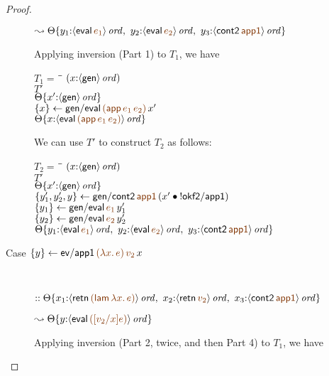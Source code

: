 \begin{proof}
\begin{description}
\qquad\qquad
  $\leadsto
   \tackon{\Theta}
     {y_1{:}\istrue{\susp{{\sf eval}\,\lf{e_1}}}, ~
      y_2{:}\istrue{\susp{{\sf eval}\,\lf{e_2}}}, ~
      y_3{:}\istrue{\susp{{\sf cont2}\,\lf{\sf app1}}}}$
\medskip

Applying inversion (Part 1) to $T_1$, we have 

\begin{tabbing}
$T_1 = ~$ \= \qquad \= $(x{:}{\langle {\sf gen} \rangle}\,{{\it ord}})$
\\
\>$T'$
\\
\>\>${\Theta}\{{x'{:}{\langle {\sf gen} \rangle}\,{{\it ord}}}\}$
\\
\>$\trstep{x}{{\sf gen/eval}\,\lf{({\sf app}\,e_1\,e_2)}\,x'}$
\\
\>\>$\tackon{\Theta}{x{:}\istrue{\susp{{\sf eval}\,\lf{({\sf app}\,e_1\,e_2)}}}}$
\end{tabbing}

We can use $T'$ to construct $T_2$ as follows:

\begin{tabbing}
$T_2 = ~$ \= \qquad \= $(x{:}{\langle {\sf gen} \rangle}\,{{\it ord}})$
\\
\>$T'$
\\
\>\>${\Theta}\{{x'{:}{\langle {\sf gen} \rangle}\,{{\it ord}}}\}$
\\
\>$\trstep{y_1',y_2',y}{{\sf gen/cont2}\,\lf{{\sf app1}}\,(\tfuser{x'}{\tbangr{{\sf okf2/app1}}})}$
\\
\>$\trstep{y_1}{{\sf gen/eval}\,\lf{e_1}\,y_1'}$
\\
\>$\trstep{y_2}{{\sf gen/eval}\,\lf{e_2}\,y_2'}$
\\
\>\>$\tackon{\Theta}{y_1{:}\istrue{\susp{{\sf eval}\,\lf{e_1}}}, ~
      y_2{:}\istrue{\susp{{\sf eval}\,\lf{e_2}}}, ~
      y_3{:}\istrue{\susp{{\sf cont2}\,\lf{\sf app1}}}}$
\end{tabbing}

\item 
  [Case $\trstep{y}{{\sf ev/app1}\,\lf{(\lambda x.\,e)}\,\lf{v_2}\,x}$]~

\qquad
  $::
   \tackon{\Theta}{x_1{:}\istrue{\susp{{\sf retn}\,\lf{({\sf lam}\,\lambda x.\,e)}}}, ~
                   x_2{:}\istrue{\susp{{\sf retn}\,\lf{v_2}}}, ~
                   x_3{:}\istrue{\susp{{\sf cont2}\,\lf{\sf app1}}}}$

\qquad\qquad
  $\leadsto
   \tackon{\Theta}{y{:}\istrue{\susp{{\sf eval}\,\lf{([v_2/x]e)}}}}$

\medskip
Applying inversion (Part 2, twice, and then Part 4) to $T_1$, we have


\end{description}
\end{proof}
